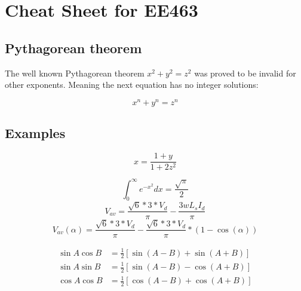 \documentclass[twocolumn]{article}
\begin{document}
\section{Cheat Sheet for EE463}

\subsection{ Pythagorean theorem}

The well known Pythagorean theorem \(x^2 + y^2 = z^2\) was 
proved to be invalid for other exponents. 
Meaning the next equation has no integer solutions:
 
$$ x^n + y^n = z^n $$


\subsection{ Examples}

$$x=\frac{1+y}{1+2z^2}$$

$$\int_0^\infty e^{-x^2} dx=\frac{\sqrt{\pi}}{2}$$
$$V_{av}=\frac{\sqrt{6}*3*V_{d}}{\pi }-\frac{3wL_{s}I_{d}}{\pi }$$
$$V_{av}(\alpha)=\frac{\sqrt{6}*3*V_{d}}{\pi }-\frac{\sqrt{6}*3*V_{d}}{\pi }*(1-\cos(\alpha))$$

\begin{align*}
          \sin A \cos B &= \frac{1}{2}\left[ \sin(A-B)+\sin(A+B) \right] \\
          \sin A \sin B &= \frac{1}{2}\left[ \sin(A-B)-\cos(A+B) \right] \\
          \cos A \cos B &= \frac{1}{2}\left[ \cos(A-B)+\cos(A+B) \right] \\         
\end{align*}
\end{document}
